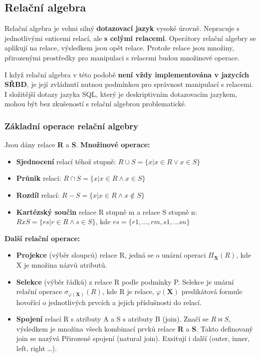 \subsection{Relační algebra}
Relační algebra je velmi silný \textbf{dotazovací jazyk} vysoké úrovně. Nepracuje s jednotlivými enticemi relací, ale \textbf{s celými relacemi}. Operátory relační algebry se aplikují na relace, výsledkem jsou opět relace. Protože relace jsou množiny, přirozenými prostředky pro manipulaci s relacemi budou množinové operace.

I když relační algebra v této podobě \textbf{není vždy implementována v jazycích SŘBD}, je její zvládnutí nutnou podmínkou pro správnost manipulací s relacemi. I složitější dotazy jazyka SQL, který je deskriptivním dotazovacím jazykem, mohou být bez zkušeností s relační algebrou problematické. 

\subsubsection{Základní operace relační algebry}
Jsou dány relace \textbf{R} a \textbf{S}. \textbf{Množinové operace:}
\begin{itemize}
\item \textbf{Sjednocení} relací téhož stupně:      $R \cup S = \{x | x \in R \vee x \in S\}$
\item \textbf{Průnik} relací:                                 $R \cap S = \{x | x \in R \wedge x \in S\}$
\item \textbf{Rozdíl} relací:                                   $R  -  S = \{x | x \in R \wedge x \notin S\}$
\item \textbf{Kartézský součin} relace R stupně m a relace S stupně n: $R x S = \{rs | r \in R \wedge s \in S\}$,  kde  $rs = \{r1,...,rm,s1,...sn\}$
\end{itemize}
\textbf{Další relační operace: }
\begin{itemize}
\item \textbf{Projekce} (výběr sloupců) relace R, jedná se o unární operaci $\Pi_\mathbf{X}( R )$, kde X je množina názvů atributů.
\item \textbf{Selekce} (výběr řádků) z relace R podle podmínky P. Selekce je unární relační operace $\sigma_{\varphi(\mathbf{X})}( R )$, kde R je relace, $\varphi(\mathbf{X})$ predikátová formule hovořící o jednotlivých prvcích a jejich příslušnosti do relací.
\item \textbf{Spojení} relací R s atributy A  a  S  s atributy  B (join).  Značí se $R \bowtie S$, výsledkem je množina všech kombinací prvků relace \textbf{R} a \textbf{S}. Takto definovaný join se nazývá Přirozené spojení (natural join). Exsitují i další (outer, inner, left, right \ldots).
\end{itemize}


